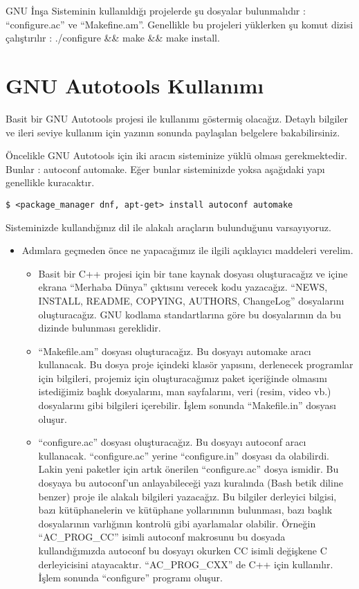 \documentclass[
]{book}
\providecommand{\tightlist}{%
  \setlength{\itemsep}{0pt}\setlength{\parskip}{0pt}}
\begin{document}
GNU İnşa Sisteminin kullanıldığı projelerde şu dosyalar bulunmalıdır : ``configure.ac'' ve ``Makefine.am''. Genellikle bu projeleri yüklerken şu komut dizisi çalıştırılır : ./configure \&\& make \&\& make install.

\hypertarget{gnu-autotools-kullanux131mux131}{%
\section{GNU Autotools Kullanımı}\label{gnu-autotools-kullanux131mux131}}

Basit bir GNU Autotools projesi ile kullanımı göstermiş olacağız. Detaylı bilgiler ve ileri seviye kullanım için yazının sonunda paylaşılan belgelere bakabilirsiniz.

Öncelikle GNU Autotools için iki aracın sisteminize yüklü olması gerekmektedir. Bunlar : autoconf automake. Eğer bunlar sisteminizde yoksa aşağıdaki yapı genellikle kuracaktır.

\texttt{\$\ \textless{}package\_manager\ dnf,\ apt-get\textgreater{}\ install\ autoconf\ automake}

Sisteminizde kullandığınız dil ile alakalı araçların bulunduğunu varsayıyoruz.

\begin{itemize}
\item
  Adımlara geçmeden önce ne yapacağımız ile ilgili açıklayıcı maddeleri verelim.

  \begin{itemize}
  \tightlist
  \item
    Basit bir C++ projesi için bir tane kaynak dosyası oluşturacağız ve içine ekrana ``Merhaba Dünya'' çıktısını verecek kodu yazacağız. ``NEWS, INSTALL, README, COPYING, AUTHORS, ChangeLog'' dosyalarını oluşturacağız. GNU kodlama standartlarına göre bu dosyalarının da bu dizinde bulunması gereklidir.
  \item
    ``Makefile.am'' dosyası oluşturacağız. Bu dosyayı automake aracı kullanacak. Bu dosya proje içindeki klasör yapısını, derlenecek programlar için bilgileri, projemiz için oluşturacağımız paket içeriğinde olmasını istediğimiz başlık dosyalarını, man sayfalarını, veri (resim, video vb.) dosyalarını gibi bilgileri içerebilir. İşlem sonunda ``Makefile.in'' dosyası oluşur.
  \item
    ``configure.ac'' dosyası oluşturacağız. Bu dosyayı autoconf aracı kullanacak. ``configure.ac'' yerine ``configure.in'' dosyası da olabilirdi. Lakin yeni paketler için artık önerilen ``configure.ac'' dosya ismidir. Bu dosyaya bu autoconf'un anlayabileceği yazı kuralında (Bash betik diline benzer) proje ile alakalı bilgileri yazacağız. Bu bilgiler derleyici bilgisi, bazı kütüphanelerin ve kütüphane yollarınının bulunması, bazı başlık dosyalarının varlığının kontrolü gibi ayarlamalar olabilir. Örneğin ``AC\_PROG\_CC'' isimli autoconf makrosunu bu dosyada kullandığımızda autoconf bu dosyayı okurken CC isimli değişkene C derleyicisini atayacaktır. ``AC\_PROG\_CXX'' de C++ için kullanılır. İşlem sonunda ``configure'' programı oluşur.
  \end{itemize}
\end{itemize}
\end{document}
